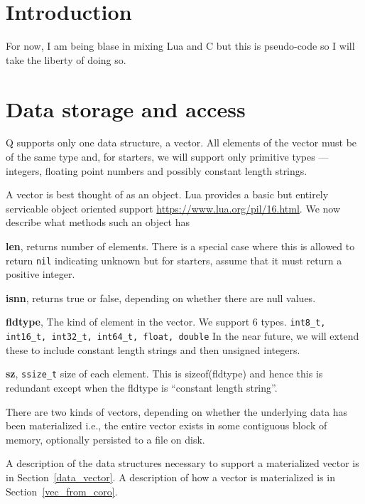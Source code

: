 \newcommand{\Assign}{\verb+:=+ }

\section{Introduction}

For now, I am being blase in mixing Lua and C but this is pseudo-code 
so I will take the liberty of doing so.

\TBC


\section{Data storage and access}

Q supports only one data structure, a vector. All elements of the vector must be
of the same type and, for starters, we will support only primitive types ---
integers, floating point numbers and possibly constant length strings.

A vector is best thought of as an object. Lua provides a basic but entirely
servicable object oriented support \url{https://www.lua.org/pil/16.html}.
We now describe what methods such an object has

\be
\item {\bf len}, returns number of elements. There is a special case where this
is allowed to return {\tt nil} indicating unknown but for starters, assume that it
must return a positive integer. 

\item {\bf isnn}, returns true or false, depending on whether there are null values. 
\item {\bf fldtype}, The kind of element in the vector. 
We support 6 types.
{\tt int8\_t, int16\_t, int32\_t, int64\_t, float, double}
In the near  future, we will extend these to include constant length 
strings and then unsigned integers. 

\item {\bf sz}, \verb+ssize_t+ size of each element. This is sizeof(fldtype) and
hence this is redundant except when the fldtype is ``constant length
string''.
\ee

There are two kinds of vectors, depending on whether the underlying data has
been materialized i.e., the entire vector exists in some contiguous block of
memory, optionally persisted to a file on disk.

A description of the data structures necessary to support a materialized vector
is in Section~\ref{data_vector}. A description of how a vector is materialized
is in Section~\ref{vec_from_coro}.

